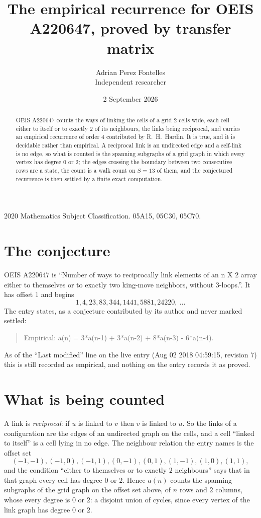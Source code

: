 \documentclass[11pt,a4paper]{article}
\title{The empirical recurrence for OEIS A220647, proved by transfer matrix}
\author{Adrian Perez Fontelles\\ \small Independent researcher}
\date{2 September 2026}
\theoremstyle{plain}
\theoremstyle{definition}
\begin{document}
\maketitle

\begin{abstract}
OEIS A220647 counts the ways of linking the cells of a grid $2$ cells wide, each cell either to
itself or to exactly $2$ of its neighbours, the links being reciprocal, and carries an
empirical recurrence of order $4$ contributed by R.~H.~Hardin. It is true, and it is
decidable rather than empirical. A reciprocal link is an undirected edge and a self-link is
no edge, so what is counted is the spanning subgraphs of a grid graph in which every vertex
has degree $0$ or $2$; the edges crossing the boundary between two consecutive rows are a
state, the count is a walk count on $S=13$ of them, and the conjectured recurrence is then
settled by a finite exact computation.
\end{abstract}

\noindent\small 2020 Mathematics Subject Classification. 05A15, 05C30, 05C70.\normalsize

\section{The conjecture}

OEIS A220647 is ``Number of ways to reciprocally link elements of an n X 2 array either to themselves or to exactly two king-move neighbors, without 3-loops.''. It has offset $1$ and begins
\[
1, 4, 23, 83, 344, 1441, 5881, 24220,\ \dots
\]
The entry states, as a conjecture contributed by its author and never marked settled:
\begin{quote}
Empirical: a(n) = 3*a(n-1) + 3*a(n-2) + 8*a(n-3) - 6*a(n-4).
\end{quote}
As of the ``Last modified'' line on the live entry (Aug 02 2018 04:59:15, revision 7) this is still
recorded as empirical, and nothing on the entry records it as proved.

\section{What is being counted}

A link is \emph{reciprocal}: if $u$ is linked to $v$ then $v$ is linked to $u$. So the links
of a configuration are the edges of an undirected graph on the cells, and a cell ``linked to
itself'' is a cell lying in no edge. The neighbour relation the entry names is the offset set
\[
(-1,-1), (-1,0), (-1,1), (0,-1), (0,1), (1,-1), (1,0), (1,1),
\]
and the condition ``either to themselves or to exactly $2$ neighbours'' says that in that
graph every cell has degree $0$ or $2$. Hence $a(n)$ counts the spanning subgraphs of the
grid graph on the offset set above, of $n$ rows and $2$ columns,
whose every degree is $0$ or $2$: a disjoint union of cycles, since every vertex of the link graph has degree $0$ or $2$.
\end{document}
